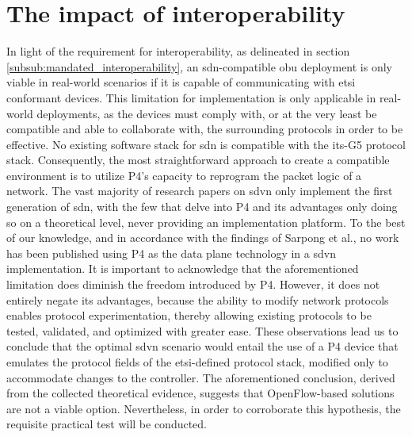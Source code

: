 \section{The impact of interoperability}
In light of the requirement for interoperability, as delineated in section \ref{subsub:mandated_interoperability}, an \gls{sdn}-compatible \gls{obu} deployment is only viable in real-world scenarios if it is capable of communicating with \gls{etsi} conformant devices. This limitation for implementation is only applicable in real-world deployments, as the devices must comply with, or at the very least be compatible and able to collaborate with, the surrounding protocols in order to be effective. No existing software stack for \gls{sdn} is compatible with the \gls{its}-G5 protocol stack. Consequently, the most straightforward approach to create a compatible environment is to utilize P4’s capacity to reprogram the packet logic of a network. 
The vast majority of research papers on \gls{sdvn} only implement the first generation of \gls{sdn}, with the few that delve into P4 and its advantages only doing so on a theoretical level, never providing an implementation platform. To the best of our knowledge, and in accordance with the findings of Sarpong et al.\cite{sarpong_potential_2023}, no work has been published using P4 as the data plane technology in a \gls{sdvn} implementation. 
It is important to acknowledge that the aforementioned limitation does diminish the freedom introduced by P4. However, it does not entirely negate its advantages, because the ability to modify network protocols enables protocol experimentation, thereby allowing existing protocols to be tested, validated, and optimized with greater ease.
These observations lead us to conclude that the optimal \gls{sdvn} scenario would entail the use of a P4 device that emulates the protocol fields of the \gls{etsi}-defined protocol stack, modified only to accommodate changes to the controller. The aforementioned conclusion, derived from the collected theoretical evidence, suggests that OpenFlow-based solutions are not a viable option. Nevertheless, in order to corroborate this hypothesis, the requisite practical test will be conducted.
